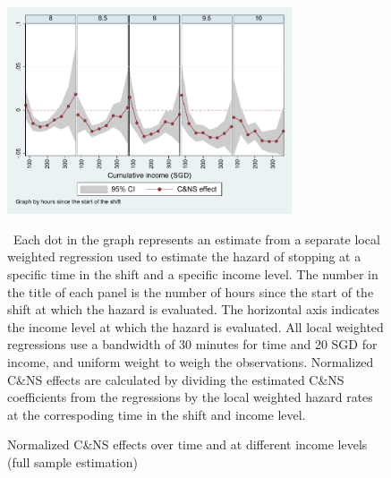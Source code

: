 \documentclass[reviewmode]{restat}
\begin{document}
\begin{figure}
	{\centering
		\caption{Normalized C\&NS effects over time and at different income levels (full sample estimation)} %
		\includegraphics[width=0.75\textwidth]{./fg/cnsmfxulwr80to100.pdf}
		\label{fg:2dulwr}
	}
	\begin{figurenotes}
	\small\ Each dot in the graph represents an estimate from a separate local weighted regression used to estimate the hazard of stopping at a specific time in the shift and a specific income level. The number in the title of each panel is the number of hours since the start of the shift at which the hazard is evaluated. The horizontal axis indicates the income level at which the hazard is evaluated. All local weighted regressions use a bandwidth of 30 minutes for time and 20 SGD for income, and uniform weight to weigh the observations. Normalized C\&NS effects are calculated by dividing the estimated C\&NS coefficients from the regressions by the local weighted hazard rates at the correspoding time in the shift and income level. 
	\end{figurenotes}
\end{figure}

\FloatBarrier
\end{document}
